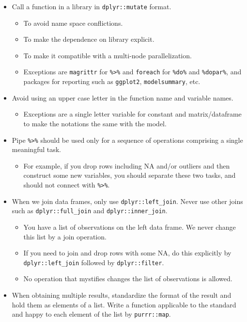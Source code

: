 \documentclass[
]{book}
\providecommand{\tightlist}{%
  \setlength{\itemsep}{0pt}\setlength{\parskip}{0pt}}
\begin{document}
\begin{itemize}
\tightlist
\item
  Call a function in a library in \texttt{dplyr::mutate} format.

  \begin{itemize}
  \tightlist
  \item
    To avoid name space conflictions.
  \item
    To make the dependence on library explicit.
  \item
    To make it compatible with a multi-node parallelization.
  \item
    Exceptions are \texttt{magrittr} for \texttt{\%\textgreater{}\%} and \texttt{foreach} for \texttt{\%do\%} and \texttt{\%dopar\%}, and packages for reporting such as \texttt{ggplot2}, \texttt{modelsummary}, etc.
  \end{itemize}
\item
  Avoid using an upper case letter in the function name and variable names.

  \begin{itemize}
  \tightlist
  \item
    Exceptions are a single letter variable for constant and matrix/dataframe to make the notations the same with the model.
  \end{itemize}
\item
  Pipe \texttt{\%\textgreater{}\%} should be used only for a sequence of operations comprising a single meaningful task.

  \begin{itemize}
  \tightlist
  \item
    For example, if you drop rows including NA and/or outliers and then construct some new variables, you should separate these two tasks, and should not connect with \texttt{\%\textgreater{}\%}.
  \end{itemize}
\item
  When we join data frames, only use \texttt{dplyr::left\_join}. Never use other joins such as \texttt{dplyr::full\_join} and \texttt{dplyr::inner\_join}.

  \begin{itemize}
  \tightlist
  \item
    You have a list of observations on the left data frame. We never change this list by a join operation.
  \item
    If you need to join and drop rows with some NA, do this explicitly by \texttt{dplyr::left\_join} followed by \texttt{dplyr::filter}.
  \item
    No operation that mystifies changes the list of observations is allowed.
  \end{itemize}
\item
  When obtaining multiple results, standardize the format of the result and hold them as elements of a list. Write a function applicable to the standard and happy to each element of the list by \texttt{purrr::map}.


\end{itemize}
\end{document}
